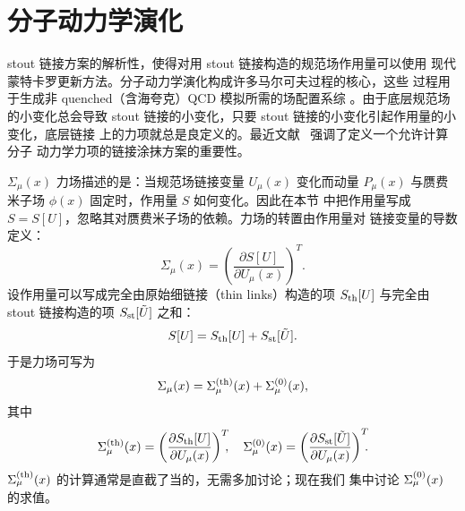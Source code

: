 \section{分子动力学演化}
\label{sec:force}

stout 链接方案的解析性，使得对用 stout 链接构造的规范场作用量可以使用
现代蒙特卡罗更新方法。分子动力学演化构成许多马尔可夫过程的核心，这些
过程用于生成非 quenched（含海夸克）QCD 模拟所需的场配置系综%
\cite{hmcgauge,hmcfermion,hmc,Ralgorithm}。由于底层规范场的小变化总会导致
stout 链接的小变化，只要 stout 链接的小变化引起作用量的小变化，底层链接
上的力项就总是良定义的。最近文献~\cite{flic2} 强调了定义一个允许计算分子
动力学力项的链接涂抹方案的重要性。

$\Sigma_\mu(x)$ 力场描述的是：当规范场链接变量 $U_\mu(x)$ 变化而动量
$P_\mu(x)$ 与赝费米子场 $\phi(x)$ 固定时，作用量 $S$ 如何变化。因此在本节
中把作用量写成 $S=S[U]$，忽略其对赝费米子场的依赖。力场的转置由作用量对
链接变量的导数定义：
\begin{equation}
 \Sigma_\mu(x)=\left(\frac{\partial S[U]}{\partial U_\mu(x)}\right)^T.
\end{equation}
设作用量可以写成完全由原始细链接（thin links）构造的项 $S_{\rm th}[U]$
与完全由 stout 链接构造的项 $S_{\rm st}[\tilde{U}]$ 之和：
\begin{equation}
  S[U]=S_{\rm th}[U]+S_{\rm st}[\tilde{U}].
\end{equation}
于是力场可写为
\begin{equation}
  \Sigma_\mu(x)=\Sigma_\mu^{\rm(th)}(x)+\Sigma_\mu^{(0)}(x),
\end{equation}
其中
\begin{equation}
 \Sigma_\mu^{\rm(th)}(x)=\left(\frac{\partial S_{\rm th}[U]}{
  \partial U_\mu(x)}\right)^T\!\!\!, \quad
 \Sigma_\mu^{\rm(0)}(x)=\left(\frac{\partial S_{\rm st}[\tilde{U}]}{
  \partial U_\mu(x)}\right)^T\!\!\!.
\end{equation}
$\Sigma_\mu^{\rm(th)}(x)$ 的计算通常是直截了当的，无需多加讨论；现在我们
集中讨论 $\Sigma_\mu^{\rm(0)}(x)$ 的求值。

